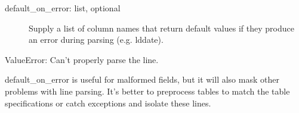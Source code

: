 \documentclass[letterpaper,10pt,english]{sphinxmanual}
\begin{document}
\begin{fulllineitems}
\begin{fulllineitems}
\begin{description}
\item[{default\_on\_error: list, optional}] \leavevmode
Supply a list of column names that return default values if they
produce an error during parsing (e.g. lddate).

\end{description}

ValueError:  Can’t properly parse the line.

default\_on\_error is useful for malformed fields, but it will also mask
other problems with line parsing. It’s better to pre\sphinxhyphen{}process tables 
to match the table specifications or catch exceptions and isolate 
these lines.

\begin{sphinxVerbatim}[commandchars=\\\{\}]
   
   
\end{sphinxVerbatim}

\end{fulllineitems}


\begin{fulllineitems}
\label{\detokenize{infrapy.database:infrapy.database.schema.fd_params.minlen}}
\end{fulllineitems}


\begin{fulllineitems}
\label{\detokenize{infrapy.database:infrapy.database.schema.fd_params.name}}
\end{fulllineitems}


\end{fulllineitems}
\end{document}
